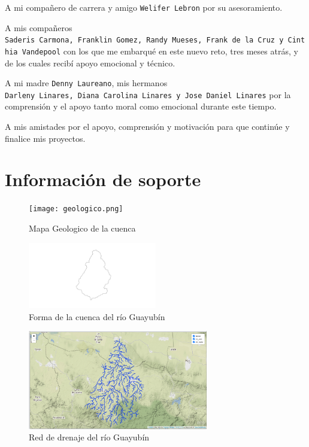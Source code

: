 \documentclass[11pt,]{article}
\begin{document}
A mi compañero de carrera y amigo \texttt{Welifer\ Lebron} por su
asesoramiento.

A mis compañeros
\texttt{Saderis\ Carmona,\ Franklin\ Gomez,\ Randy\ Mueses,\ Frank\ de\ la\ Cruz\ y\ Cinthia\ Vandepool}
con los que me embarqué en este nuevo reto, tres meses atrás, y de los
cuales recibí apoyo emocional y técnico.

A mi madre \texttt{Denny\ Laureano}, mis hermanos
\texttt{Darleny\ Linares,\ Diana\ Carolina\ Linares\ y\ Jose\ Daniel\ Linares}
por la comprensión y el apoyo tanto moral como emocional durante este
tiempo.

A mis amistades por el apoyo, comprensión y motivación para que continúe
y finalice mis proyectos.

\section{Información de soporte}\label{informaciuxf3n-de-soporte}

\begin{figure}
\centering
\texttt{[image: geologico.png]}
\caption{Mapa Geologico de la cuenca\label{magecu}}
\end{figure}

\begin{figure}
\centering
\includegraphics[width=0.50000\textwidth]{cuenca extraida.png}
\caption{Forma de la cuenca del río Guayubín\label{forma}}
\end{figure}

\begin{figure}
\centering
\includegraphics[width=0.70000\textwidth]{red de drenaje extraida.png}
\caption{Red de drenaje del río Guayubín\label{red de drenaje extraida}}
\end{figure}
\end{document}
